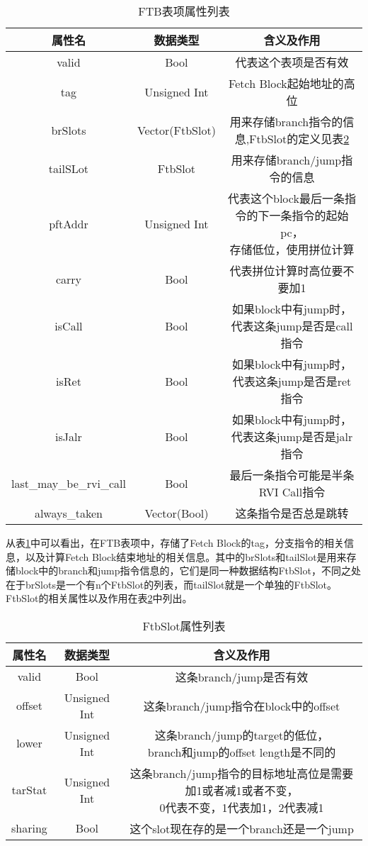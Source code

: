 \begin{table}[]
	\caption{FTB表项属性列表}
	\label{tb:table1}
	\centering
	\begin{tabular}{|c|c|c|}
		\hline
		属性名   & 数据类型   & 含义及作用   \\ \hline
		valid & Bool & 代表这个表项是否有效 \\ \hline
		tag & Unsigned Int & Fetch Block起始地址的高位 \\ \hline
		brSlots & Vector(FtbSlot) & 用来存储branch指令的信息,FtbSlot的定义见表\ref{tb:table2} \\ \hline
		tailSLot & FtbSlot & 用来存储branch/jump指令的信息 \\ \hline
		pftAddr & Unsigned Int & \tabincell{c}{代表这个block最后一条指令的下一条指令的起始pc， \\ 存储低位，使用拼位计算} \\ \hline
		carry & Bool & 代表拼位计算时高位要不要加1 \\ \hline
		isCall & Bool & 如果block中有jump时，代表这条jump是否是call指令 \\ \hline
		isRet & Bool & 如果block中有jump时，代表这条jump是否是ret指令 \\ \hline
		isJalr & Bool & 如果block中有jump时，代表这条jump是否是jalr指令 \\ \hline
		last\_may\_be\_rvi\_call & Bool & 最后一条指令可能是半条RVI Call指令 \\ \hline
		always\_taken & Vector(Bool) & 这条指令是否总是跳转 \\ \hline
	\end{tabular}
\end{table}

从表\ref{tb:table1}中可以看出，在FTB表项中，存储了Fetch Block的tag，分支指令的相关信息，以及计算Fetch Block结束地址的相关信息。其中的brSlots和tailSlot是用来存储block中的branch和jump指令信息的，它们是同一种数据结构FtbSlot，不同之处在于brSlots是一个有n个FtbSlot的列表，而tailSlot就是一个单独的FtbSlot。FtbSlot的相关属性以及作用在表\ref{tb:table2}中列出。

\begin{table}[]
	\caption{FtbSlot属性列表}
	\label{tb:table2}
	\centering
	\begin{tabular}{|c|c|c|}
		\hline
		属性名   & 数据类型   & 含义及作用   \\ \hline
		valid & Bool & 这条branch/jump是否有效 \\ \hline
		offset & Unsigned Int & 这条branch/jump指令在block中的offset \\ \hline
		lower & Unsigned Int & \tabincell{c}{这条branch/jump的target的低位， \\ branch和jump的offset length是不同的} \\ \hline
		tarStat & Unsigned Int & \tabincell{c}{这条branch/jump指令的目标地址高位是需要加1或者减1或者不变， \\ 0代表不变，1代表加1，2代表减1} \\ \hline
		sharing & Bool & 这个slot现在存的是一个branch还是一个jump \\ \hline
	\end{tabular}
\end{table}

